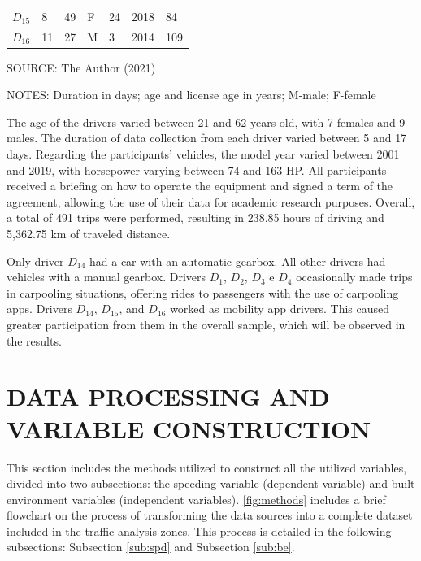 \begin{table}[!htbp]
\begin{tabular}{lllllll}
        $D_{15}$ & 8  & 49 & F & 24 & 2018 & 84  \\ %
        $D_{16}$ & 11 & 27 & M & 3  & 2014 & 109 \\ %
        \hline
    \end{tabular}
    \label{tab:drivers}
    \par \vspace{2mm} \footnotesize \raggedright
    SOURCE: The Author (2021)
    \par \vspace{1mm} \footnotesize \raggedright
    NOTES: Duration in days; age and license age in years; M-male; F-female
\end{table}

The age of the drivers varied between 21 and 62 years old, with 7 females and 9 males. The duration of data collection from each driver varied between 5 and 17 days. Regarding the participants' vehicles, the model year varied between 2001 and 2019, with horsepower varying between 74 and 163 HP. All participants received a briefing on how to operate the equipment and signed a term of the agreement, allowing the use of their data for academic research purposes. Overall, a total of 491 trips were performed, resulting in 238.85 hours of driving and 5,362.75 km of traveled distance.

Only driver $D_{14}$ had a car with an automatic gearbox. All other drivers had vehicles with a manual gearbox. Drivers $D_{1}$, $D_{2}$, $D_{3}$ e $D_{4}$ occasionally made trips in carpooling situations, offering rides to passengers with the use of carpooling apps. Drivers $D_{14}$, $D_{15}$, and $D_{16}$ worked as mobility app drivers. This caused greater participation from them in the overall sample, which will be observed in the results. 


\section{DATA PROCESSING AND VARIABLE CONSTRUCTION} \label{data}


This section includes the methods utilized to construct all the utilized variables, divided into two subsections: the speeding variable (dependent variable) and built environment variables (independent variables). \autoref{fig:methods} includes a brief flowchart on the process of transforming the data sources into a complete dataset included in the traffic analysis zones. This process is detailed in the following subsections: Subsection \ref{sub:spd} and Subsection \ref{sub:be}.

